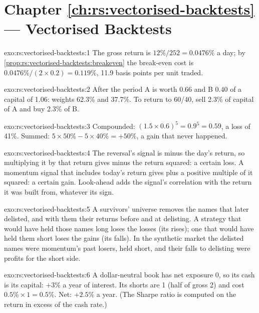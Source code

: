 \section*{Chapter \ref{ch:rs:vectorised-backtests} --- Vectorised Backtests}

\begin{solution}{exo:rs:vectorised-backtests:1}
The gross return is $12\%/252 = 0.0476\%$ a day; by \cref{prop:rs:vectorised-backtests:breakeven} the break-even cost is
$0.0476\%/(2 \times 0.2) = 0.119\%$, 11.9 basis points per unit traded.
\end{solution}

\begin{solution}{exo:rs:vectorised-backtests:2}
After the period A is worth $0.66$ and B $0.40$ of a capital of 1.06: weights 62.3\% and 37.7\%. To return to 60/40, sell 2.3\% of capital of A and buy
2.3\% of B.
\end{solution}

\begin{solution}{exo:rs:vectorised-backtests:3}
Compounded: $(1.5 \times 0.6)^5 = 0.9^5 = 0.59$, a loss of 41\%. Summed: $5 \times 50\% - 5 \times 40\% = +50\%$, a gain that never happened.
\end{solution}

\begin{solution}{exo:rs:vectorised-backtests:4}
The reversal's signal is minus the day's return, so multiplying it by that return gives minus the return squared: a certain loss. A momentum signal that
includes today's return gives plus a positive multiple of it squared: a certain gain. Look-ahead adds the signal's correlation with the return it was
built from, whatever its sign.
\end{solution}

\begin{solution}{exo:rs:vectorised-backtests:5}
A survivors' universe removes the names that later delisted, and with them their returns before and at delisting. A strategy that would have held those
names long loses the losses (its  rises); one that would have held them short loses the gains (its  falls). In the synthetic market the
delisted names were momentum's past losers, held short, and their falls to delisting were profits for the short side.
\end{solution}

\begin{solution}{exo:rs:vectorised-backtests:6}
A dollar-neutral book has net exposure 0, so its cash is its capital: $+3\%$ a year of interest. Its shorts are 1 (half of gross 2) and cost $0.5\% \times 1
= 0.5\%$. Net: $+2.5\%$ a year. (The Sharpe ratio is computed on the return in excess of the cash rate.)
\end{solution}

